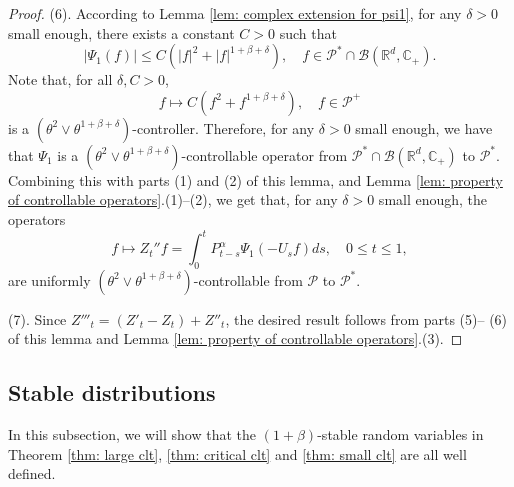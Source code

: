 \documentclass[12pt,a4paper]{amsart}
\theoremstyle{plain}
\theoremstyle{definition}
\numberwithin{equation}{section}
\begin{document}
\begin{proof}
    (6).  According to Lemma \ref{lem: complex extension for psi1}, for any $\delta > 0$ small enough, there exists a constant $C>0$ such that
\[
    |\Psi_1(f)|
    \le C(|f|^2+|f|^{1+\beta+ \delta}),
    \quad f\in \mathcal P^*\cap\mathcal B(\mathbb R^d, \mathbb C_+).
\]
        Note that, for all $\delta, C>0$,
\[
    f\mapsto C(f^2+f^{1+\beta+\delta}),
    \quad f\in \mathcal P^+
\]
        is a $(\theta^2 \vee \theta^{1+\beta+\delta})$-controller.
    Therefore, for any $\delta > 0$ small enough, we have that $\Psi_1$ is a $(\theta^2 \vee \theta^{1+\beta+\delta})$-controllable operator from $\mathcal P^*\cap\mathcal B(\mathbb R^d, \mathbb C_+)$ to $\mathcal P^*$.
        Combining  this with parts (1) and (2) of this lemma, and Lemma \ref{lem: property of controllable operators}.(1)--(2), we get that, for any $\delta > 0$ small enough, the operators
\[
    f
    \mapsto Z_t'' f
    = \int_0^t P_{t-s}^\alpha \Psi_1(-U_sf)ds,
    \quad 0\leq t\leq 1,
\]
    are uniformly $(\theta^2 \vee \theta^{1+\beta+\delta})$-controllable from $\mathcal P$ to $\mathcal P^*$.

    (7). Since $Z'''_t = (Z'_t-Z_t)+Z''_t$, the desired result follows from parts (5)-- (6) of this lemma  and Lemma \ref{lem: property of controllable operators}.(3).
\end{proof}


\subsection{Stable distributions}
\label{sec: stable distributions}

    In this subsection, we will show that the $(1+\beta)$-stable random variables in Theorem \ref{thm: large clt}, \ref{thm: critical clt} and \ref{thm: small clt} are all well defined.
\end{document}
